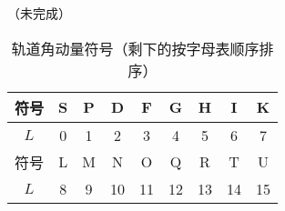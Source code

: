 （未完成）

\begin{table}[ht]
\centering
\caption{轨道角动量符号（剩下的按字母表顺序排序）}\label{QOrbAM_tab1}
\begin{tabular}{|c|c|c|c|c|c|c|c|c|}
\hline
符号 & S & P & D & F & G & H & I & K\\
\hline
$L$ & 0 & 1 & 2 & 3 & 4 & 5 & 6 & 7\\
\hline
符号 & L & M & N & O & Q & R & T & U \\
\hline
$L$ & 8 & 9 & 10 & 11 & 12 & 13 & 14 & 15 \\
\hline
\end{tabular}
\end{table}
